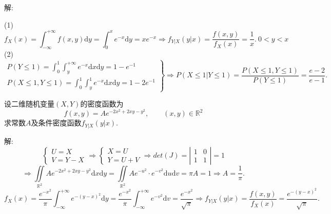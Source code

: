 \documentclass[standard]{ExBook}
\renewenvironment{shaded}{%
  \def\FrameCommand{\fboxsep=\FrameSep \colorbox{shadecolor}}%
  \MakeFramed{\advance\hsize-\width \FrameRestore}%
}{%
  \endMakeFramed
}
\begin{document}
\begin{qitems}
\vspace{\dimexpr2.5cm-5em\relax}

解: 

(1)
$$f_{X}(x)=\displaystyle\int_{-\infty}^{+\infty}f(x,y)\mathrm{d}y=\int_{0}^{x}e^{-x}\mathrm{d}y=x e^{-x} \Longrightarrow f_{Y|X}(y|x)=\displaystyle\frac{f(x,y)}{f_{X}(x)}=\frac{1}{x}.\ 0<y<x$$
(2)
$$
    \left.
    \begin{array}{r}
        P(Y\leq 1)=\displaystyle\int_{0}^{1}\int_{y}^{+\infty}e^{-x}\mathrm{d}x\mathrm{d}y=1-e^{-1}\\
        P(X\leq1,Y\leq1)=\displaystyle\int_{0}^{1}\int_{y}^{1}e^{-x}\mathrm{d}x\mathrm{d}y=1-2e^{-1}
    \end{array}
    \right\}
    \Longrightarrow
    P(X\leq1|Y\leq1)=\displaystyle\frac{P(X\leq1,Y\leq1)}{P(Y\leq 1)}=\frac{e-2}{e-1}.
$$

\vspace{2.5cm-5em}

    \begin{bbox}
    \begin{shaded}
        \qitem
设二维随机变量$(X,Y)$的密度函数为
$$f(x,y)=A e^{-2x^2+2xy-y^2},\qquad (x,y)\in\mathbb{R}^2$$
求常数$A$及条件密度函数$f_{Y|X}(y|x)$.
    \end{shaded}
    \end{bbox}

\vspace{\dimexpr2.5cm-5em\relax}

解: 
$$
    \left\{
    \begin{array}{l}
        U=X\\
        V=Y-X
    \end{array}
    \right.
    \Longrightarrow
    \left\{
    \begin{array}{l}
        X=U\\
        Y=U+V
    \end{array}
    \right.
    \Longrightarrow
    det(J)=
    \left|
    \begin{array}{cc}
        1 & 0\\
        1 & 1
    \end{array}
    \right|
    =1
$$
$$
\Longrightarrow
\displaystyle\iint\limits_{\mathbb{R}^2}A e^{-2x^2+2xy-y^2}\mathrm{d}x\mathrm{d}y=\iint\limits_{\mathbb{R}^2}A e^{-u^2}\cdot e^{-v^2}\mathrm{d}u\mathrm{d}v=\pi A=1
\Longrightarrow
A=\frac{1}{\pi}.
$$
$$f_{X}(x)=\displaystyle\frac{e^{-x^2}}{\pi}\int_{-\infty}^{+\infty}e^{-(y-x)^2}\mathrm{d}y=\frac{e^{-x^2}}{\pi}\int_{-\infty}^{+\infty}e^{-v^2}\mathrm{d}v=\frac{e^{-x^2}}{\sqrt{\pi}} \Longrightarrow f_{Y|X}(y|x)=\frac{f(x,y)}{f_{X}(x)}=\frac{e^{-(y-x)^2}}{\sqrt{\pi}}.$$


\end{qitems}
\end{document}
